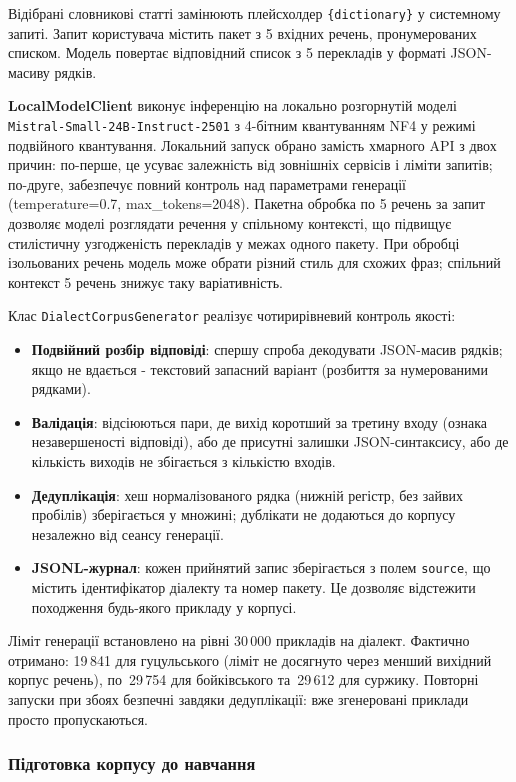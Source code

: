 \documentclass[14pt]{extarticle}
\begin{document}
Відібрані словникові статті замінюють плейсхолдер \texttt{\{dictionary\}} у системному запиті. Запит користувача містить пакет з 5 вхідних речень, пронумерованих списком. Модель повертає відповідний список з 5 перекладів у форматі JSON-масиву рядків.

\textbf{LocalModelClient} виконує інференцію на локально розгорнутій моделі \texttt{Mistral-Small-24B-Instruct-2501} з 4-бітним квантуванням NF4 у режимі подвійного квантування. Локальний запуск обрано замість хмарного API з двох причин: по-перше, це усуває залежність від зовнішніх сервісів і ліміти запитів; по-друге, забезпечує повний контроль над параметрами генерації (temperature=0.7, max\_tokens=2048). Пакетна обробка по 5 речень за запит дозволяє моделі розглядати речення у спільному контексті, що підвищує стилістичну узгодженість перекладів у межах одного пакету. При обробці ізольованих речень модель може обрати різний стиль для схожих фраз; спільний контекст 5 речень знижує таку варіативність.

Клас \texttt{DialectCorpusGenerator} реалізує чотирирівневий контроль якості:
\begin{itemize}
  \item \textbf{Подвійний розбір відповіді}: спершу спроба декодувати JSON-масив рядків; якщо не вдається - текстовий запасний варіант (розбиття за нумерованими рядками).
  \item \textbf{Валідація}: відсіюються пари, де вихід коротший за третину входу (ознака незавершеності відповіді), або де присутні залишки JSON-синтаксису, або де кількість виходів не збігається з кількістю входів.
  \item \textbf{Дедуплікація}: хеш нормалізованого рядка (нижній регістр, без зайвих пробілів) зберігається у множині; дублікати не додаються до корпусу незалежно від сеансу генерації.
  \item \textbf{JSONL-журнал}: кожен прийнятий запис зберігається з полем \texttt{source}, що містить ідентифікатор діалекту та номер пакету. Це дозволяє відстежити походження будь-якого прикладу у корпусі.
\end{itemize}

Ліміт генерації встановлено на рівні 30\,000 прикладів на діалект. Фактично отримано: 19\,841 для гуцульського (ліміт не досягнуто через менший вихідний корпус речень), по~29\,754 для бойківського та~29\,612 для суржику. Повторні запуски при збоях безпечні завдяки дедуплікації: вже згенеровані приклади просто пропускаються.

\subsubsection{Підготовка корпусу до навчання}
\end{document}
